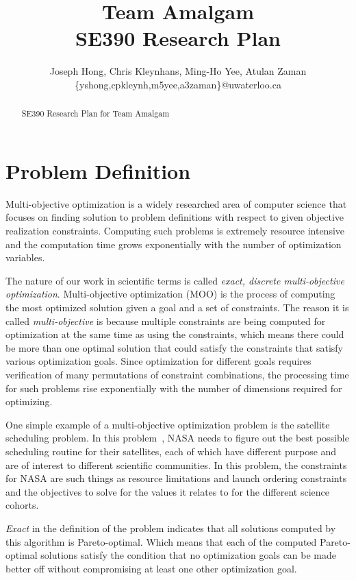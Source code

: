 \documentclass[11pt]{article}
\title{{\Large Team Amalgam} \\ SE390 Research Plan}
\author{Joseph Hong, Chris Kleynhans, Ming-Ho Yee, Atulan Zaman \\
        \{yshong,cpkleynh,m5yee,a3zaman\}@uwaterloo.ca}
\begin{document}
\maketitle

\begin{abstract}
SE390 Research Plan for Team Amalgam
\end{abstract}

\tableofcontents
\newpage

\section{Problem Definition}
Multi-objective optimization is a widely researched area of computer
science that focuses on finding solution to problem definitions with
respect to given objective realization constraints. Computing such
problems is extremely resource intensive and the computation time grows
exponentially with the number of optimization variables.

The nature of our work in scientific terms is called \textit{exact,
discrete multi-objective optimization}. Multi-objective optimization
(MOO) is the process of computing the most optimized solution given a
goal and a set of constraints. The reason it is called
\textit{multi-objective} is because multiple constraints are being
computed for optimization at the same time as using the constraints,
which means there could be more than one optimal solution that could
satisfy the constraints that satisfy various optimization goals. Since
optimization for different goals requires verification of many
permutations of constraint combinations, the processing time for such
problems rise exponentially with the number of dimensions required for
optimizing.

One simple example of a multi-objective optimization problem is the
satellite scheduling problem. In this problem~\cite{ref:nasa11}, NASA
needs to figure out the best possible scheduling routine for their
satellites, each of which have different purpose and are of interest to
different scientific communities. In this problem, the constraints for
NASA are such things as resource limitations and launch ordering
constraints and the objectives to solve for the values it relates to
for the different science cohorts.

\textit{Exact} in the definition of the problem indicates that all
solutions computed by this algorithm is Pareto-optimal. Which means
that each of the computed Pareto-optimal solutions satisfy the
condition that no optimization goals can be made better off without
compromising at least one other optimization goal.
\end{document}
